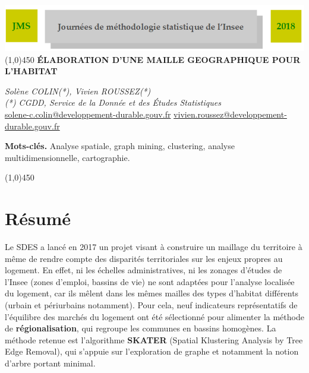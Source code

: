 \documentclass[12pt, a4paper]{article}
\begin{document}
\begin{center}
\includegraphics[width=15cm]{head_jms2018.png} 
\line(1,0){450}
\vspace{5mm}
\textbf{{\huge \'E}\Large LABORATION D'UNE MAILLE GEOGRAPHIQUE POUR L'HABITAT}
\end{center}

\begin{center}
\textit{Solène COLIN(*), Vivien ROUSSEZ(*)} \\
\vspace{2mm}
\textit{(*) CGDD, Service de la Donnée et des \'Etudes Statistiques}\\ 

\vspace{2mm}
\url{solene-c.colin@developpement-durable.gouv.fr} \url{vivien.roussez@developpement-durable.gouv.fr} 
\end{center}
\vspace{5mm}
\small{{\bf Mots-cl\'es.} Analyse spatiale, graph mining, clustering, analyse multidimensionnelle, cartographie.}

\begin{center}
\line(1,0){450}
\end{center}


\section*{Résumé}

Le SDES a lancé en 2017 un projet visant à construire un maillage du territoire à même de rendre compte des disparités territoriales sur les enjeux propres au logement. En effet, ni les échelles administratives, ni les zonages d'études de l'Insee (zones d'emploi, bassins de vie) ne sont adaptées pour l'analyse localisée du logement, car ils mêlent dans les mêmes mailles des types d'habitat différents (urbain et périurbains notamment). Pour cela, neuf indicateurs représentatifs de l'équilibre des marchés du logement ont été sélectionné pour alimenter la méthode de \textbf{régionalisation}, qui regroupe les communes en bassins homogènes. La méthode retenue est l'algorithme \textbf{SKATER} (Spatial Klustering Analysis by Tree Edge Removal), qui s'appuie sur l'exploration de graphe et notamment la notion d'arbre portant minimal. \\
\end{document}
